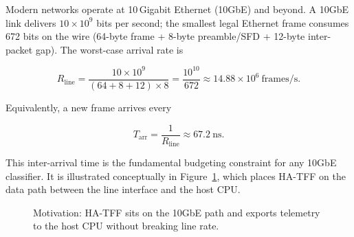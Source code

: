 \documentclass[12pt,twoside,openright]{book}
\begin{document}
Modern networks operate at 10\,Gigabit Ethernet (10GbE) and beyond. A 10GbE link delivers
$10\times10^9$ bits per second; the smallest legal Ethernet frame consumes 672 bits on the wire
(64-byte frame + 8-byte preamble/SFD + 12-byte inter-packet gap). The worst-case arrival rate is

\begin{equation}
R_{\text{line}} = \frac{10\times10^9}{(64+8+12)\times 8}
                 = \frac{10^{10}}{672}
                 \approx 14.88\times 10^6\ \text{frames/s}.
\label{eq:lineratesec}
\end{equation}

\noindent Equivalently, a new frame arrives every

\begin{equation}
T_{\text{arr}} = \frac{1}{R_{\text{line}}} \approx 67.2\ \text{ns}.
\label{eq:arrival}
\end{equation}

This inter-arrival time is the fundamental budgeting constraint for any 10GbE classifier. It is
illustrated conceptually in Figure~\ref{fig:motivation}, which places HA-TFF on the data path
between the line interface and the host CPU.

\begin{figure}[H]
\centering
\footnotesize
{}
\caption{Motivation: HA-TFF sits on the 10GbE path and exports telemetry to the host CPU without
breaking line rate.}
\label{fig:motivation}
\end{figure}
\end{document}
